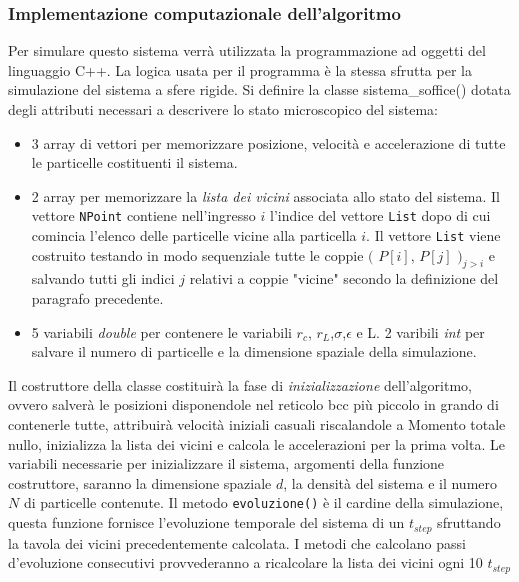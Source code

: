 \documentclass[11pt]{article}
\theoremstyle{plain}
\theoremstyle{remark}
\newcommand\Cls[1]{\textsf{#1}}
\newcommand{\cd}[1]{\texttt{#1}}
\begin{document}
\subsubsection{Implementazione computazionale dell'algoritmo}
Per simulare questo sistema verrà utilizzata la programmazione ad oggetti del linguaggio C++.
La logica usata per il programma è la stessa sfrutta per la simulazione del sistema a sfere rigide.
\newline
Si definire la classe \Cls{sistema\_soffice()} dotata degli attributi necessari a descrivere lo stato microscopico del sistema:
\begin{itemize}
\item 3 array di vettori per memorizzare posizione, velocità e accelerazione di tutte le particelle costituenti il sistema.

\item 2 array per memorizzare la \emph{lista dei vicini} associata allo stato del sistema. Il vettore \cd{NPoint} contiene nell'ingresso $i$ l'indice del vettore \cd{List} dopo di cui comincia l'elenco delle particelle vicine alla particella $i$. Il vettore \cd{List} viene costruito testando in modo sequenziale tutte le coppie $($ $P[i]$, $P[j]$ $)_{j>i}$ e salvando tutti gli indici $j$ relativi a coppie "vicine" secondo la definizione del paragrafo precedente.

\item 5 variabili \emph{double} per contenere le variabili $r_c$, $r_L$,$\sigma$,$\epsilon$ e L. 2 varibili \emph{int} per salvare il numero di particelle e la dimensione spaziale della simulazione.

\end{itemize}
Il costruttore della classe costituirà la fase di \emph{inizializzazione} dell'algoritmo, ovvero salverà le posizioni disponendole nel reticolo bcc più piccolo in grando di contenerle tutte, attribuirà velocità iniziali casuali riscalandole a Momento totale nullo, inizializza la lista dei vicini e calcola le accelerazioni per la prima volta.
Le variabili necessarie per inizializzare il sistema, argomenti della funzione costruttore, saranno la dimensione spaziale $d$, la densità del sistema e il numero $N$ di particelle contenute.
\medskip\newline
Il metodo \cd{evoluzione()} è il cardine della simulazione, questa funzione fornisce l'evoluzione temporale del sistema di un $t_{step}$ sfruttando la tavola dei vicini precedentemente calcolata. I metodi che calcolano passi d'evoluzione consecutivi provvederanno a ricalcolare la lista dei vicini ogni 10 $t_{step}$
\end{document}
